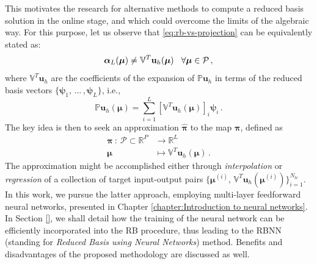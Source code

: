 \documentclass[12pt, a4paper, twoside, openright]{report}
\numberwithin{equation}{chapter}
\theoremstyle{theorem}
\theoremstyle{definition}
\theoremstyle{remark}
\theoremstyle{proposition}
\numberwithin{figure}{chapter}
\begin{document}
		This motivates the research for alternative methods to compute a reduced basis solution in the online stage, and which could overcome the limits of the algebraic way. For this purpose, let us observe that \eqref{eq:rb-vs-projection} can be equivalently stated as:
		\begin{equation}
			\label{eq:rb-vs-projection-coefficients}
			\boldsymbol{\alpha}_L(\boldsymbol{\mu}) \neq \mathbb{V}^T \mathbf{u}_h(\boldsymbol{\mu}) \hspace*{0.3cm} \forall \boldsymbol{\mu} \in \mathcal{P} \, ,
		\end{equation} 
		where $\mathbb{V}^T \mathbf{u}_h$ are the coefficients of the expansion of $\mathbb{P} \mathbf{u}_h$ in terms of the reduced basis vectors $\big\lbrace \boldsymbol{\psi}_1 , \, \ldots \, , \boldsymbol{\psi}_L \big\rbrace$, i.e.,
		\begin{equation}
			\mathbb{P} \mathbf{u}_h(\boldsymbol{\mu}) = \sum_{i = 1}^L [\mathbb{V}^T \mathbf{u}_h(\boldsymbol{\mu})]_i \boldsymbol{\psi}_i \, .
		\end{equation}
		The key idea is then to seek an approximation $\hat{\boldsymbol{\pi}}$ to the map $\boldsymbol{\pi}$, defined as
		\begin{equation}
			\label{eq:interpolation-function}
			\begin{aligned}
				\boldsymbol{\pi} ~ : ~ \mathcal{P} \subset \mathbb{R}^P & \rightarrow \mathbb{R}^L \\
				\boldsymbol{\mu} ~ & \mapsto \mathbb{V}^T \mathbf{u}_h(\boldsymbol{\mu}) \, .
			\end{aligned}
		\end{equation} 
		The approximation might be accomplished either through \emph{interpolation} \cite{Ams10, Chen17} or \emph{regression} \cite{Haa13} of a collection of target input-output pairs $\big\lbrace \boldsymbol{\mu}^{(i)}, \, \mathbb{V}^T \mathbf{u}_h(\boldsymbol{\mu}^{(i)}) \big\rbrace_{i = 1}^{N_{tr}}$. In this work, we pursue the latter approach, employing multi-layer feedforward neural networks, presented in Chapter \ref{chapter:Introduction to neural networks}. In Section \ref{}, we shall detail how the training of the neural network can be efficiently incorporated into the RB procedure, thus leading to the RBNN (standing for \emph{Reduced Basis using Neural Networks}) method. Benefits and disadvantages of the proposed methodology are discussed as well.
		
		\vspace*{0.3cm}
		
\end{document}
